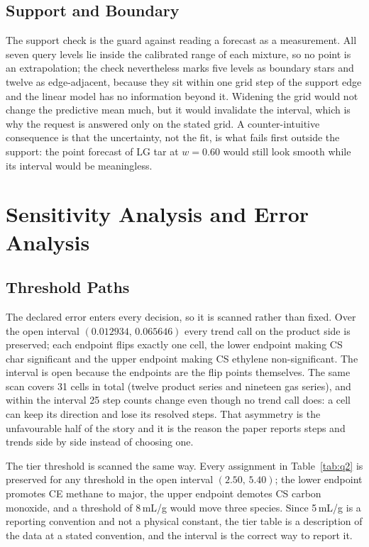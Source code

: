\documentclass[withoutpreface,bwprint]{apmcmthesis}
\begin{document}
\subsection{Support and Boundary}
The support check is the guard against reading a forecast as a measurement. All seven query levels lie inside the calibrated range of each mixture, so no point is an extrapolation; the check nevertheless marks five levels as boundary stars and twelve as edge-adjacent, because they sit within one grid step of the support edge and the linear model has no information beyond it. Widening the grid would not change the predictive mean much, but it would invalidate the interval, which is why the request is answered only on the stated grid. A counter-intuitive consequence is that the uncertainty, not the fit, is what fails first outside the support: the point forecast of LG tar at $w=0.60$ would still look smooth while its interval would be meaningless.

\section{Sensitivity Analysis and Error Analysis}
\label{sec:sens}
\subsection{Threshold Paths}
The declared error enters every decision, so it is scanned rather than fixed. Over the open interval $(0.012934,\,0.065646)$ every trend call on the product side is preserved; each endpoint flips exactly one cell, the lower endpoint making CS char significant and the upper endpoint making CS ethylene non-significant. The interval is open because the endpoints are the flip points themselves. The same scan covers 31 cells in total (twelve product series and nineteen gas series), and within the interval 25 step counts change even though no trend call does: a cell can keep its direction and lose its resolved steps. That asymmetry is the unfavourable half of the story and it is the reason the paper reports steps and trends side by side instead of choosing one.

The tier threshold is scanned the same way. Every assignment in Table~\ref{tab:q2} is preserved for any threshold in the open interval $(2.50,\,5.40)$; the lower endpoint promotes CE methane to major, the upper endpoint demotes CS carbon monoxide, and a threshold of 8\,mL/g would move three species. Since 5\,mL/g is a reporting convention and not a physical constant, the tier table is a description of the data at a stated convention, and the interval is the correct way to report it.
\end{document}
